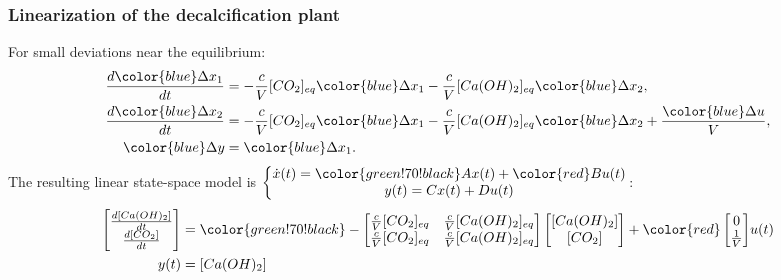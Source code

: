 \documentclass{beamer}
\begin{document}
\begin{frame}
\frametitle{Linearization of the decalcification plant}
For small deviations near the equilibrium:
\begin{align*}
\frac{d{\color{blue}\Delta x_1}}{dt} &= -\frac{c}{V} [CO_2]_{eq} {\color{blue}\Delta x_1} - \frac{c}{V} [Ca(OH)_2]_{eq} {\color{blue}\Delta x_2}, \\
\frac{d{\color{blue}\Delta x_2}}{dt} &= -\frac{c}{V} [CO_2]_{eq} {\color{blue}\Delta x_1} - \frac{c}{V} [Ca(OH)_2]_{eq} {\color{blue}\Delta x_2} + \frac{{\color{blue}\Delta u}}{V}, \\
{\color{blue}\Delta y} &= {\color{blue}\Delta x_1}.
\end{align*}
\pause
The resulting linear state-space model is $\begin{aligned}\left\{ \begin{matrix} \dot{x}(t) = {\color{green!70!black}A}x(t) + {\color{red}B}u(t) \\ y(t) = Cx(t) + Du(t) \end{matrix}\right.\end{aligned}$:
\pause
\begin{align*}
\begin{bmatrix}
\frac{d[Ca(OH)_2]}{dt} \\
\frac{d[CO_2]}{dt}
\end{bmatrix} &= 
{\color{green!70!black}
-\begin{bmatrix}
\frac{c}{V}[CO_2]_{eq} & \frac{c}{V}[Ca(OH)_2]_{eq} \\
\frac{c}{V}[CO_2]_{eq} & \frac{c}{V}[Ca(OH)_2]_{eq} \\
\end{bmatrix}}
\begin{bmatrix}
[Ca(OH)_2] \\
[CO_2]
\end{bmatrix} +
{\color{red}
\begin{bmatrix}
0 \\
\frac{1}{V} \\
\end{bmatrix}} u(t) \\
y(t) &= [Ca(OH)_2]
\end{align*}
\end{frame}
\end{document}
